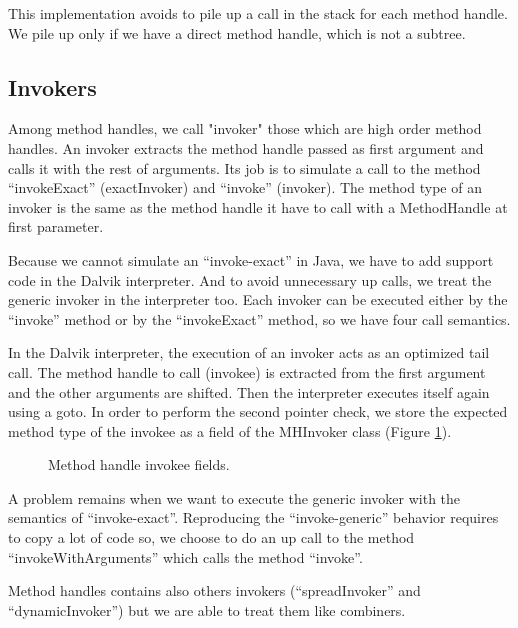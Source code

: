 \documentclass{sig-alternate}
\begin{document}
      This implementation avoids to pile up a call in the stack for each method handle.
      We pile up only if we have a direct method handle, which is not a subtree.

    \subsection{Invokers}

      Among method handles, we call "invoker" those which are high order method handles.
      An invoker extracts the method handle passed as first argument and calls it with the rest of arguments.
      Its job is to simulate a call to the method ``invokeExact'' (exactInvoker) and ``invoke'' (invoker).
      The method type of an invoker is the same as the method handle it have to call with a MethodHandle at first parameter.

      Because we cannot simulate an ``invoke-exact'' in Java, we have to add support code in the Dalvik interpreter.
      And to avoid unnecessary up calls, we treat the generic invoker in the interpreter too.
      Each invoker can be executed either by the ``invoke'' method or by the ``invokeExact'' method, so we have four call semantics.

      In the Dalvik interpreter, the execution of an invoker acts as an optimized tail call.
      The method handle to call (invokee) is extracted from the first argument and the other arguments are shifted.
      Then the interpreter executes itself again using a goto.
      In order to perform the second pointer check, we store the expected method type of the invokee as a field of the MHInvoker class (Figure \ref{invokeeFields}).

      \begin{figure}[!h]
        \centering \vspace{-1.5em}
        \caption{Method handle invokee fields.}
        \label{invokeeFields}
      \end{figure}

      A problem remains when we want to execute the generic invoker with the semantics of ``invoke-exact''.
      Reproducing the ``invoke-generic'' behavior requires to copy a lot of code so,
      we choose to do an up call to the method ``invokeWithArguments'' which calls the method ``invoke''.

      Method handles contains also others invokers (``spreadInvoker'' and ``dynamicInvoker'') but we are able to treat them like combiners.
\end{document}
